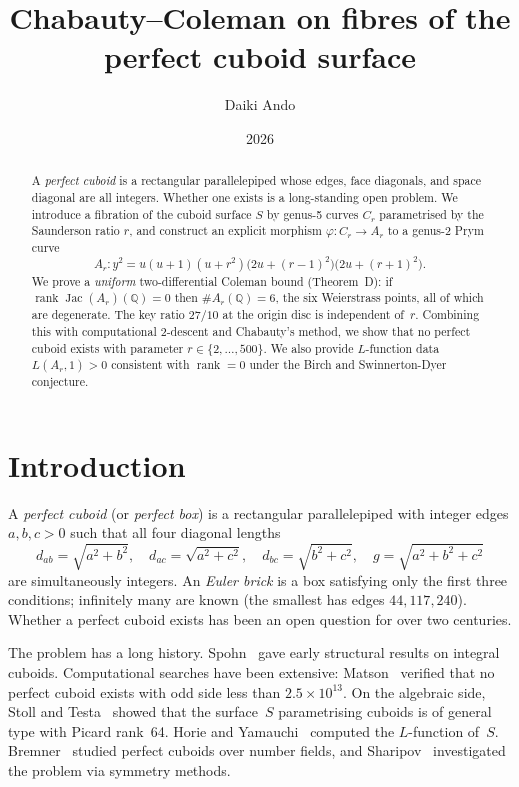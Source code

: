 \documentclass[11pt]{amsart}
\title[Chabauty--Coleman on the perfect cuboid surface]%
      {Chabauty--Coleman on fibres of the perfect cuboid surface}
\author{Daiki Ando}
\date{2026}
\theoremstyle{plain}
\theoremstyle{definition}
\theoremstyle{remark}
\newcommand{\QQ}{\mathbb{Q}}
\newcommand{\Jac}{\operatorname{Jac}}
\newcommand{\rank}{\operatorname{rank}}
\begin{document}
\begin{abstract}
A \emph{perfect cuboid} is a rectangular parallelepiped whose edges, face diagonals,
and space diagonal are all integers.  Whether one exists is a long-standing open problem.
We introduce a fibration of the cuboid surface $S$ by genus-5 curves $C_r$
parametrised by the Saunderson ratio $r$, and construct an explicit morphism
$\varphi\colon C_r \to A_r$ to a genus-2 Prym curve
\[
  A_r\colon y^2 = u(u+1)(u+r^2)\bigl(2u+(r{-}1)^2\bigr)\bigl(2u+(r{+}1)^2\bigr).
\]
We prove a \emph{uniform} two-differential Coleman bound (Theorem~D):
if $\rank\Jac(A_r)(\QQ)=0$ then $\#A_r(\QQ)=6$, the six Weierstrass points,
all of which are degenerate.  The key ratio $27/10$ at the origin disc is
independent of~$r$.  Combining this with computational 2-descent and Chabauty's
method, we show that no perfect cuboid exists with parameter $r\in\{2,\dots,500\}$.
We also provide $L$-function data $L(A_r,1)>0$ consistent with $\rank=0$
under the Birch and Swinnerton-Dyer conjecture.
\end{abstract}

\maketitle

\section{Introduction}\label{sec:intro}

A \emph{perfect cuboid} (or \emph{perfect box}) is a rectangular parallelepiped
with integer edges $a,b,c>0$ such that all four diagonal lengths
\begin{equation}\label{eq:cuboid}
  d_{ab}=\sqrt{a^2+b^2},\quad d_{ac}=\sqrt{a^2+c^2},\quad
  d_{bc}=\sqrt{b^2+c^2},\quad g=\sqrt{a^2+b^2+c^2}
\end{equation}
are simultaneously integers.  An \emph{Euler brick} is a box satisfying only
the first three conditions; infinitely many are known (the smallest has
edges $44, 117, 240$).  Whether a perfect cuboid exists has been an open question
for over two centuries.

The problem has a long history.  Spohn~\cite{Spohn1972} gave early structural results
on integral cuboids.  Computational searches have been extensive:
Matson~\cite{Matson2015} verified that no perfect cuboid exists with odd side less
than $2.5\times 10^{13}$.  On the algebraic side, Stoll and Testa~\cite{StollTesta2010}
showed that the surface~$S$ parametrising cuboids is of general type with Picard rank~64.
Horie and Yamauchi~\cite{HorieYamauchi2025} computed the $L$-function of~$S$.
Bremner~\cite{Bremner2017} studied perfect cuboids over number fields, and
Sharipov~\cite{Sharipov2020} investigated the problem via symmetry methods.
\end{document}
